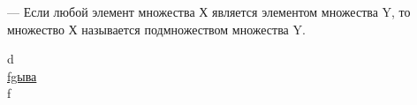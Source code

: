 

 –-- Если любой элемент множества Х является
элементом множества Y, то множество Х называется подмножеством множества Y.\\



\newpage


\begin{otherlanguage}{russian}


d\\
\ul{fgыва}\\
f


\end{otherlanguage}




%
